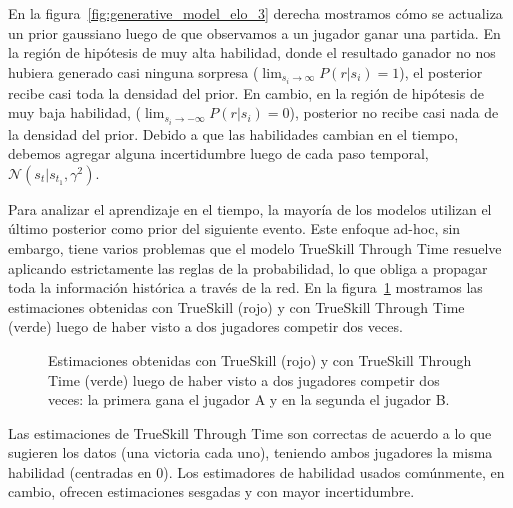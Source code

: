 \documentclass[a4paper,11pt]{book}
\newcommand{\N}{\mathcal{N}}
\theoremstyle{definition}
\begin{document}

En la figura~\ref{fig:generative_model_elo_3} derecha mostramos c\'omo se actualiza un prior gaussiano luego de que observamos a un jugador ganar una partida.
%
En la regi\'on de hip\'otesis de muy alta habilidad, donde el resultado ganador no nos hubiera generado casi ninguna sorpresa ($\lim_{s_i \to \infty}P(r|s_i) = 1$), el posterior recibe casi toda la densidad del prior.
%
En cambio, en la regi\'on de hip\'otesis de muy baja habilidad, ($\lim_{s_i \to -\infty}P(r|s_i) = 0$), posterior no recibe casi nada de la densidad del prior.
%
Debido a que las habilidades cambian en el tiempo, debemos agregar alguna incertidumbre luego de cada paso temporal, $\N(s_t | s_{t_1}, \gamma^2)$.


Para analizar el aprendizaje en el tiempo, la mayor\'ia de los modelos utilizan el \'ultimo posterior como prior del siguiente evento.
%
Este enfoque ad-hoc, sin embargo, tiene varios problemas que el modelo TrueSkill Through Time resuelve aplicando estrictamente las reglas de la probabilidad, lo que obliga a propagar toda la informaci\'on hist\'orica a trav\'es de la red.
%
En la figura~\ref{fig:trueskillthroughtime} mostramos las estimaciones obtenidas con TrueSkill (rojo) y con TrueSkill Through Time (verde) luego de haber visto a dos jugadores competir dos veces.
%
\begin{figure}[ht!]
\centering
{}
\caption{
 Estimaciones obtenidas con TrueSkill (rojo) y con TrueSkill Through Time (verde) luego de haber visto a dos jugadores competir dos veces: la primera gana el jugador A y en la segunda el jugador B.
}
\label{fig:trueskillthroughtime}
\end{figure}
%
Las estimaciones de TrueSkill Through Time son correctas de acuerdo a lo que sugieren los datos (una victoria cada uno), teniendo ambos jugadores la misma habilidad (centradas en 0).
%
Los estimadores de habilidad usados com\'unmente, en cambio, ofrecen estimaciones sesgadas y con mayor incertidumbre.
\end{document}

